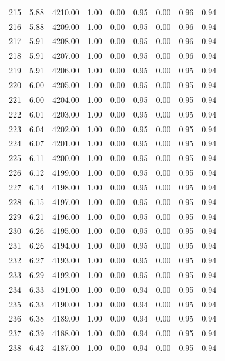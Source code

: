\documentclass{article}\usepackage[]{graphicx}\usepackage[]{color}
\begin{document}
\begin{longtable}{rrrrrrrrr}
  215 & 5.88 & 4210.00 & 1.00 & 0.00 & 0.95 & 0.00 & 0.96 & 0.94 \\ 
  216 & 5.88 & 4209.00 & 1.00 & 0.00 & 0.95 & 0.00 & 0.96 & 0.94 \\ 
  217 & 5.91 & 4208.00 & 1.00 & 0.00 & 0.95 & 0.00 & 0.96 & 0.94 \\ 
  218 & 5.91 & 4207.00 & 1.00 & 0.00 & 0.95 & 0.00 & 0.96 & 0.94 \\ 
  219 & 5.91 & 4206.00 & 1.00 & 0.00 & 0.95 & 0.00 & 0.95 & 0.94 \\ 
  220 & 6.00 & 4205.00 & 1.00 & 0.00 & 0.95 & 0.00 & 0.95 & 0.94 \\ 
  221 & 6.00 & 4204.00 & 1.00 & 0.00 & 0.95 & 0.00 & 0.95 & 0.94 \\ 
  222 & 6.01 & 4203.00 & 1.00 & 0.00 & 0.95 & 0.00 & 0.95 & 0.94 \\ 
  223 & 6.04 & 4202.00 & 1.00 & 0.00 & 0.95 & 0.00 & 0.95 & 0.94 \\ 
  224 & 6.07 & 4201.00 & 1.00 & 0.00 & 0.95 & 0.00 & 0.95 & 0.94 \\ 
  225 & 6.11 & 4200.00 & 1.00 & 0.00 & 0.95 & 0.00 & 0.95 & 0.94 \\ 
  226 & 6.12 & 4199.00 & 1.00 & 0.00 & 0.95 & 0.00 & 0.95 & 0.94 \\ 
  227 & 6.14 & 4198.00 & 1.00 & 0.00 & 0.95 & 0.00 & 0.95 & 0.94 \\ 
  228 & 6.15 & 4197.00 & 1.00 & 0.00 & 0.95 & 0.00 & 0.95 & 0.94 \\ 
  229 & 6.21 & 4196.00 & 1.00 & 0.00 & 0.95 & 0.00 & 0.95 & 0.94 \\ 
  230 & 6.26 & 4195.00 & 1.00 & 0.00 & 0.95 & 0.00 & 0.95 & 0.94 \\ 
  231 & 6.26 & 4194.00 & 1.00 & 0.00 & 0.95 & 0.00 & 0.95 & 0.94 \\ 
  232 & 6.27 & 4193.00 & 1.00 & 0.00 & 0.95 & 0.00 & 0.95 & 0.94 \\ 
  233 & 6.29 & 4192.00 & 1.00 & 0.00 & 0.95 & 0.00 & 0.95 & 0.94 \\ 
  234 & 6.33 & 4191.00 & 1.00 & 0.00 & 0.94 & 0.00 & 0.95 & 0.94 \\ 
  235 & 6.33 & 4190.00 & 1.00 & 0.00 & 0.94 & 0.00 & 0.95 & 0.94 \\ 
  236 & 6.38 & 4189.00 & 1.00 & 0.00 & 0.94 & 0.00 & 0.95 & 0.94 \\ 
  237 & 6.39 & 4188.00 & 1.00 & 0.00 & 0.94 & 0.00 & 0.95 & 0.94 \\ 
  238 & 6.42 & 4187.00 & 1.00 & 0.00 & 0.94 & 0.00 & 0.95 & 0.94 \\ 

\end{longtable}
\end{document}
